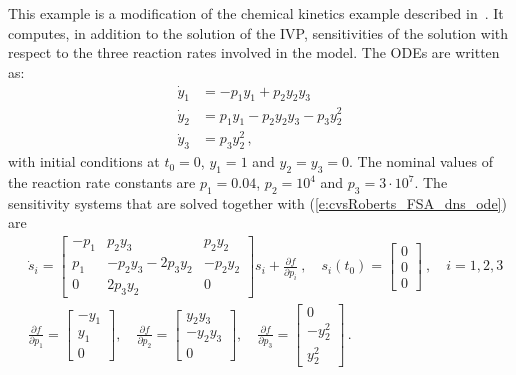 This example is a modification of the chemical kinetics example 
described in~\cite{cvode_ex}.  It computes, in addition to the solution of the
IVP, sensitivities of the solution with respect to the three reaction rates 
involved in the model. The ODEs are written as:
\begin{equation}\label{e:cvsRoberts_FSA_dns_ode}
  \begin{split}
    {\dot y}_1 &= -p_1 y_1 + p_2 y_2 y_3   \\
    {\dot y}_2 &=  p_1 y_1 - p_2 y_2 y_3 - p_3 y_2^2 \\
    {\dot y}_3 &=  p_3 y_2^2 \, ,
  \end{split}
\end{equation}
with initial conditions at $t_0 = 0$, $y_1 = 1$ and $y_2 = y_3 = 0$. 
The nominal values of the reaction rate constants are 
$p_1 = 0.04$, $p_2 = 10^4$ and $p_3 = 3\cdot 10^7$.
The sensitivity systems that are solved together with (\ref{e:cvsRoberts_FSA_dns_ode}) are
\begin{equation}\label{e:cvsRoberts_FSA_dns_sens}
  \begin{split}
    & {\dot s}_i = 
    \begin{bmatrix}
      - p_1 &   p_2 y_3             &   p_2 y_2 \\
        p_1 & - p_2 y_3 - 2 p_3 y_2 & - p_2 y_2 \\
        0   &             2 p_3 y_2 &  0              
    \end{bmatrix}
    s_i + \frac{\partial f}{\partial p_i} ~,
    \quad s_i(t_0) = \begin{bmatrix} 0 \\ 0 \\ 0 \end{bmatrix}  ~,
    \quad i = 1,2,3 \\
    & \frac{\partial f}{\partial p_1} = \begin{bmatrix} -y_1 \\ y_1 \\ 0 \end{bmatrix}, \quad
    \frac{\partial f}{\partial p_2} = \begin{bmatrix} y_2 y_3 \\ -y_2 y_3 \\ 0 \end{bmatrix}, \quad
    \frac{\partial f}{\partial p_3} = \begin{bmatrix} 0 \\ - y_2^2 \\ y_2^2 \end{bmatrix} \, .
  \end{split}
\end{equation}


